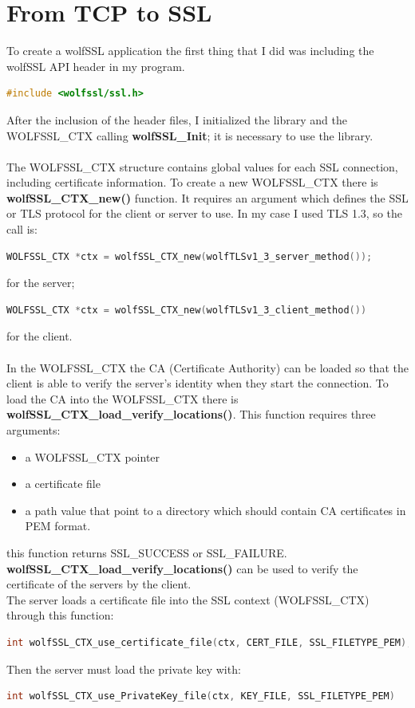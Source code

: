 \documentclass[a4paper,12pt]{report}
\begin{document}
\section{From TCP to SSL}
To create a wolfSSL application the first thing that I did was including the wolfSSL API header in my program.
\begin{lstlisting}[language=c]
#include <wolfssl/ssl.h>
\end{lstlisting}
After the inclusion of the header files, I initialized the library and the WOLFSSL\_CTX calling \textbf{wolfSSL\_Init}; it is necessary to use the library.
\\\\ The WOLFSSL\_CTX structure contains global values for each SSL connection, including certificate information.
To create a new WOLFSSL\_CTX there is \textbf{wolfSSL\_CTX\_new()} function. It requires an argument which defines the SSL or TLS protocol for the client or server to use. In my case I used TLS 1.3, so the call is: 
\begin{lstlisting}[language=c]
WOLFSSL_CTX *ctx = wolfSSL_CTX_new(wolfTLSv1_3_server_method());
\end{lstlisting}
for the server;
\begin{lstlisting}[language=c]
WOLFSSL_CTX *ctx = wolfSSL_CTX_new(wolfTLSv1_3_client_method())
\end{lstlisting}
for the client.
\\\\In the WOLFSSL\_CTX the CA (Certificate Authority) can be loaded so that the client is able to verify the server's identity when they start the connection. To load the CA into the WOLFSSL\_CTX there is \\\textbf{wolfSSL\_CTX\_load\_verify\_locations()}. This function requires three arguments:
\begin{itemize}
\item a WOLFSSL\_CTX pointer
\item a certificate file
\item a path value that point to a directory which should contain CA certificates in PEM format.
\end{itemize}
this function returns SSL\_SUCCESS or SSL\_FAILURE.
\\\textbf{wolfSSL\_CTX\_load\_verify\_locations()} can be used to verify the certificate of the servers by the client.
\\The server loads a certificate file into the SSL context (WOLFSSL\_CTX) through this function:
\begin{lstlisting}[language=c]
int wolfSSL_CTX_use_certificate_file(ctx, CERT_FILE, SSL_FILETYPE_PEM);
\end{lstlisting}
Then the server must load the private key with:
\begin{lstlisting}[language=c]
int wolfSSL_CTX_use_PrivateKey_file(ctx, KEY_FILE, SSL_FILETYPE_PEM)
\end{lstlisting}
\end{document}
